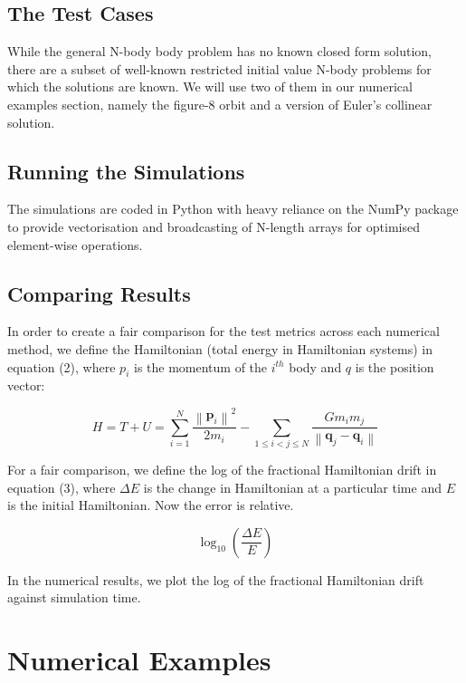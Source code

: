 \documentclass[a4paper,11pt]{article}
\begin{document}
\subsection{The Test Cases}

While the general N-body body problem has no known closed form solution, there are a subset of well-known restricted initial value N-body problems for which the solutions are known. We will use two of them in our numerical examples section, namely the figure-8 orbit and a version of Euler's collinear solution.

\subsection{Running the Simulations}

The simulations are coded in Python with heavy reliance on the NumPy package to provide vectorisation and broadcasting of N-length arrays for optimised element-wise operations.

\subsection{Comparing Results}

In order to create a fair comparison for the test metrics across each numerical method, we define the Hamiltonian (total energy in Hamiltonian systems) in equation (2), where $p_{i}$ is the momentum of the $i^{th}$ body and $q$ is the position vector:

\begin{equation}
    \label{Hamiltonian}
    {\displaystyle H=T+U=\sum _{i=1}^{N}{\frac {\left\|\mathbf {p} _{i}\right\|^{2}}{2m_{i}}} - \sum _{1\leq i<j\leq N}{\frac {Gm_{i}m_{j}}{\left\|\mathbf {q} _{j}-\mathbf {q} _{i}\right\|}}}
\end{equation}

For a fair comparison, we define the log of the fractional Hamiltonian drift in equation (3), where $\Delta E$ is the change in Hamiltonian at a particular time and $E$ is the initial Hamiltonian. Now the error is relative.

\begin{equation}
    \label{fractional energy error vs time}
    \log_{10} \left ( {\frac {\Delta E}{E}} \right )
\end{equation}

In the numerical results, we plot the log of the fractional Hamiltonian drift against simulation time.

\section{Numerical Examples}
\end{document}
